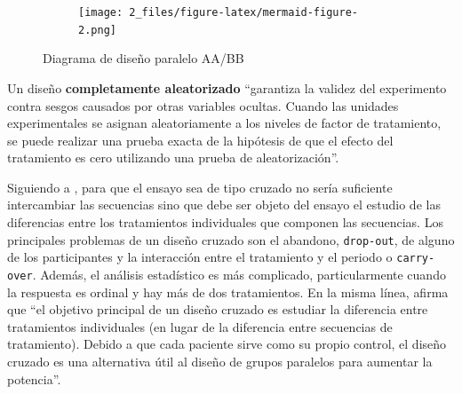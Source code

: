 \documentclass[
  12pt,
  a4paper,
  extrafontsizes,
  onecolumn,
  openright,
  table]{memoir}
\begin{document}
\begin{figure}

{\centering 

\begin{figure}[H]

{\centering \texttt{[image: 2\_files/figure-latex/mermaid-figure-2.png]}

}

\end{figure}

}

\caption{\label{fig-aa-bb}Diagrama de diseño paralelo AA/BB}

\end{figure}

Un diseño \textbf{completamente aleatorizado}
\autocite[pp.~18]{lawson2015} \enquote{garantiza la validez del
experimento contra sesgos causados por otras variables ocultas. Cuando
las unidades experimentales se asignan aleatoriamente a los niveles de
factor de tratamiento, se puede realizar una prueba exacta de la
hipótesis de que el efecto del tratamiento es cero utilizando una prueba
de aleatorización}.

Siguiendo a \textcite[pp.~5-9]{senn2022}, para que el ensayo sea de tipo
cruzado no sería suficiente intercambiar las secuencias sino que debe
ser objeto del ensayo el estudio de las diferencias entre los
tratamientos individuales que componen las secuencias. Los principales
problemas de un diseño cruzado son el abandono, \texttt{drop-out}, de
alguno de los participantes y la interacción entre el tratamiento y el
periodo o \texttt{carry-over}. Además, el análisis estadístico es más
complicado, particularmente cuando la respuesta es ordinal y hay más de
dos tratamientos. En la misma línea, \textcite[pp.~1-2]{lui2016} afirma
que \enquote{el objetivo principal de un diseño cruzado es estudiar la
diferencia entre tratamientos individuales (en lugar de la diferencia
entre secuencias de tratamiento). Debido a que cada paciente sirve como
su propio control, el diseño cruzado es una alternativa útil al diseño
de grupos paralelos para aumentar la potencia}.
\end{document}

